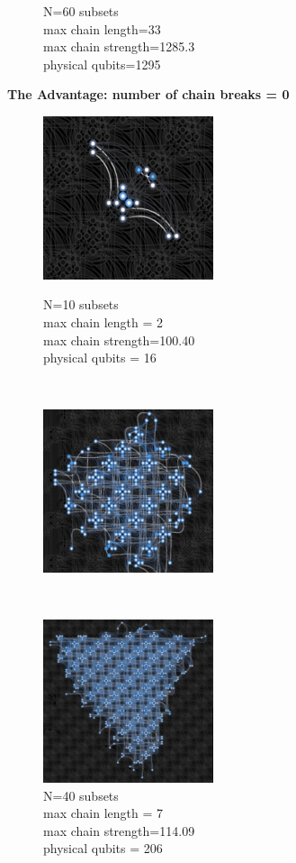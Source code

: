 \documentclass[oneside,a4paper]{article}
\begin{document}
\begin{figure}[htp]
\begin{minipage}[b]{4.5cm}
\caption{N=60 subsets\\max chain length=33\\max chain strength=1285.3\\physical qubits=1295}
\end{minipage}
\end{figure}
\newpage
\textbf{The Advantage: number of chain breaks = 0}
\begin{figure}[htp]
\begin{minipage}[b]{4.5cm}
\includegraphics[width=5cm]{LaTeXTemplate/Images/AdvantageN10.png}
\caption{N=10 subsets\\max chain length = 2\\max chain strength=100.40\\physical qubits = 16}
\end{minipage}
\ \hspace{2mm} \hspace{2mm} \
\begin{minipage}[b]{4.5cm}
\includegraphics[width=5cm]{LaTeXTemplate/Images/AdvantageN40.png}
\caption{N=40 subsets\\max chain length = 7\\max chain strength=114.09\\physical qubits = 206}
\end{minipage}
\ \hspace{2mm} \hspace{2mm} \
\begin{minipage}[b]{4.5cm}
\centering
\includegraphics[width=5cm]{LaTeXTemplate/Images/AdvantageN70.png}

\end{minipage}
\end{figure}
\end{document}

